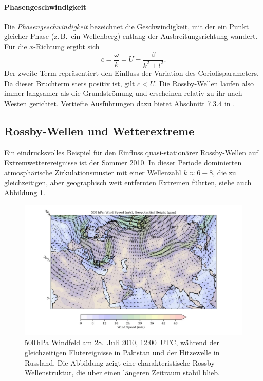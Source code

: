 \paragraph{Phasengeschwindigkeit}
Die \emph{Phasengeschwindigkeit} bezeichnet die Geschwindigkeit, mit der ein
Punkt gleicher Phase (z.\,B.\ ein Wellenberg) entlang der Ausbreitungsrichtung
wandert. Für die $x$-Richtung ergibt sich
\begin{equation}
	c = \frac{\omega}{k} = U - \frac{\beta}{k^2+l^2}.
	\label{rossby:phasengeschwindigkeit}
\end{equation}
Der zweite Term repräsentiert den Einfluss der Variation des Coriolisparameters.
Da dieser Bruchterm stets positiv ist, gilt $c < U$.
Die Rossby-Wellen laufen also immer langsamer als die Grundströmung und
erscheinen relativ zu ihr nach Westen gerichtet.
Vertiefte Ausführungen dazu bietet Abschnitt 7.3.4 in \cite{rossby:mueller2018}.

\subsection{Rossby-Wellen und Wetterextreme}


Ein eindrucksvolles Beispiel für den Einfluss quasi-stationärer Rossby-Wellen
auf Extremwetterereignisse ist der Sommer 2010. In dieser Periode dominierten
atmosphärische Zirkulationsmuster mit einer Wellenzahl \(k \approx 6-8\), die zu
gleichzeitigen, aber geographisch weit entfernten Extremen führten, siehe auch Abbildung \ref{fig:rossby_2010}.


\begin{figure}
	\centering
	\includegraphics[width=\textwidth, trim=2cm 0cm 3cm 0cm, clip]{papers/rossby/images/data_2010_7_28_12_00_500.jpg}
	\caption{500\,hPa Windfeld am
		28.\ Juli 2010, 12:00~UTC, während der gleichzeitigen Flutereignisse in Pakistan und
		der Hitzewelle in Russland. Die Abbildung zeigt eine charakteristische Rossby-Wellenstruktur,
		die über einen längeren Zeitraum stabil blieb.}
	\label{fig:rossby_2010}
\end{figure}



